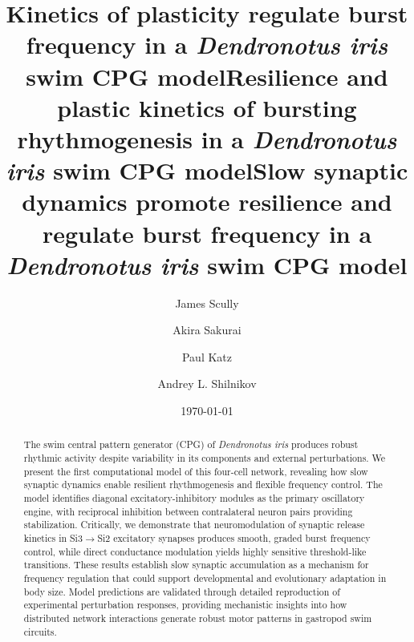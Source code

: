\documentclass[nofootinbib,aip,amsmath,amssymb,preprint,twocolumn,floatfix,10pt]{revtex4-2}
\begin{document}
\title{Kinetics of plasticity regulate burst frequency in a {\em Dendronotus iris} swim CPG model}
\title{Resilience and plastic kinetics of bursting rhythmogenesis in a {\em Dendronotus iris} swim CPG model}
\title{Slow synaptic dynamics promote resilience and regulate burst frequency in a {\em Dendronotus iris} swim CPG model}

\author{James Scully}
\author{Akira Sakurai}
\author{Paul Katz}
\author{Andrey L. Shilnikov}


\date{\today}
\begin{abstract}

The swim central pattern generator (CPG) of {\em Dendronotus iris} produces robust rhythmic activity despite variability in its components and external perturbations.
We present the first computational model of this four-cell network, revealing how slow synaptic dynamics enable resilient rhythmogenesis and flexible frequency control.
The model identifies diagonal excitatory-inhibitory modules as the primary oscillatory engine, with reciprocal inhibition between contralateral neuron pairs providing stabilization.
Critically, we demonstrate that neuromodulation of synaptic release kinetics in Si3$\to$Si2 excitatory synapses produces smooth, graded burst frequency control, while direct conductance modulation yields highly sensitive threshold-like transitions.
These results establish slow synaptic accumulation as a mechanism for frequency regulation that could support developmental and evolutionary adaptation in body size.
Model predictions are validated through detailed reproduction of experimental perturbation responses, providing mechanistic insights into how distributed network interactions generate robust motor patterns in gastropod swim circuits.
\end{abstract}
\end{document}
